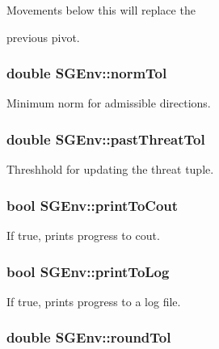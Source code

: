 \begin{DoxyVerb}           Movements below this will replace the
\end{DoxyVerb}
 previous pivot. \hypertarget{classSGEnv_af55398623fd3c53009f27d7563cc552d}{
\subsubsection[{norm\-Tol}]{\setlength{\rightskip}{0pt plus 5cm}double S\-G\-Env\-::norm\-Tol\hspace{0.3cm}{\ttfamily [private]}}}\label{classSGEnv_af55398623fd3c53009f27d7563cc552d}
Minimum norm for admissible directions. \hypertarget{classSGEnv_a61ed41e3ef6d9b6a19aef48a63a73cba}{
\subsubsection[{past\-Threat\-Tol}]{\setlength{\rightskip}{0pt plus 5cm}double S\-G\-Env\-::past\-Threat\-Tol\hspace{0.3cm}{\ttfamily [private]}}}\label{classSGEnv_a61ed41e3ef6d9b6a19aef48a63a73cba}
Threshhold for updating the threat tuple. \hypertarget{classSGEnv_a9130f5ec6bc17593fea6705cffcdea6f}{
\subsubsection[{print\-To\-Cout}]{\setlength{\rightskip}{0pt plus 5cm}bool S\-G\-Env\-::print\-To\-Cout\hspace{0.3cm}{\ttfamily [private]}}}\label{classSGEnv_a9130f5ec6bc17593fea6705cffcdea6f}
If true, prints progress to cout. \hypertarget{classSGEnv_a4200d165b83a050e52b9a2f8c5e60581}{
\subsubsection[{print\-To\-Log}]{\setlength{\rightskip}{0pt plus 5cm}bool S\-G\-Env\-::print\-To\-Log\hspace{0.3cm}{\ttfamily [private]}}}\label{classSGEnv_a4200d165b83a050e52b9a2f8c5e60581}
If true, prints progress to a log file. \hypertarget{classSGEnv_a0a354af36c33f1860aa62729d9773e09}{
\subsubsection[{round\-Tol}]{\setlength{\rightskip}{0pt plus 5cm}double S\-G\-Env\-::round\-Tol\hspace{0.3cm}{\ttfamily [private]}}}\label{classSGEnv_a0a354af36c33f1860aa62729d9773e09}
